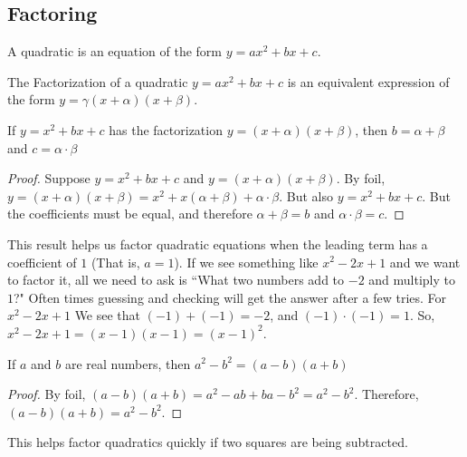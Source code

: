\documentclass[crop=false,class=article,oneside]{standalone}
\begin{document}
    \subsection{Factoring}
        \begin{definition}
        A quadratic is an equation of the form $y=ax^{2}+bx+c$.
        \end{definition}
        \begin{definition}
        The Factorization of a quadratic $y=ax^{2}+bx+c$ is an equivalent expression of the form $y=\gamma(x+\alpha)(x+\beta)$.
        \end{definition}
        \begin{theorem}
        \label{theorem:north_shore_factorization_of_quadratic_when_a_is_equal_to_zero}
        If $y=x^{2}+bx+c$ has the factorization $y=(x+\alpha)(x+\beta)$, then $b=\alpha+\beta$ and $c=\alpha\cdot\beta$
        \end{theorem}
        \begin{proof}
        Suppose $y=x^{2}+bx+c$ and $y=(x+\alpha)(x+\beta)$. By \gls{foil}, $y=(x+\alpha)(x+\beta)=x^{2}+x(\alpha+\beta)+\alpha\cdot\beta$. But also $y=x^{2}+bx+c$. But the coefficients must be equal, and therefore $\alpha+\beta=b$ and $\alpha\cdot\beta=c$.
        \end{proof}
        \begin{remark}\label{remark:north_shore_example_of_using_factorization_when_a_equals_zero}
        This result helps us factor quadratic equations when the leading term has a coefficient of $1$ (That is, $a=1$). If we see something like $x^{2}-2x+1$ and we want to factor it, all we need to ask is ``What two numbers add to $-2$ and multiply to $1$?" Often times guessing and checking will get the answer after a few tries. For $x^{2}-2x+1$ We see that $(-1)+(-1)=-2$, and $(-1)\cdot (-1)=1$. So, $x^{2}-2x+1=(x-1)(x-1)=(x-1)^{2}$.
        \end{remark}
        \begin{theorem}
        \label{theorem:north_shore_difference_of_squares}
        If $a$ and $b$ are real numbers, then $a^{2}-b^{2}=(a-b)(a+b)$
        \end{theorem}
        \begin{proof}
        By \gls{foil}, $(a-b)(a+b)=a^{2}-ab+ba-b^{2}=a^{2}-b^{2}$. Therefore, $(a-b)(a+b)=a^{2}-b^{2}$.
        \end{proof}
        \begin{remark}
        This helps factor quadratics quickly if two squares are being subtracted.
        \end{remark}
\end{document}
